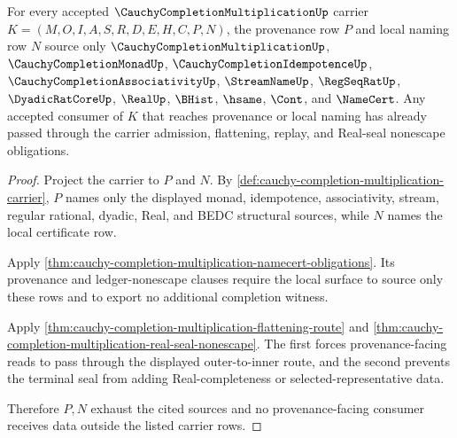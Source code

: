\begin{theorem}
\label{thm:cauchy-completion-multiplication-provenance-exhaustion}
For every accepted $\CauchyCompletionMultiplicationUp$ carrier $K=(M,O,I,A,S,R,D,E,H,C,P,N)$, the provenance row $P$ and local naming row $N$ source only $\CauchyCompletionMultiplicationUp$, $\CauchyCompletionMonadUp$, $\CauchyCompletionIdempotenceUp$, $\CauchyCompletionAssociativityUp$, $\StreamNameUp$, $\RegSeqRatUp$, $\DyadicRatCoreUp$, $\RealUp$, $\BHist$, $\hsame$, $\Cont$, and $\NameCert$. Any accepted consumer of $K$ that reaches provenance or local naming has already passed through the carrier admission, flattening, replay, and Real-seal nonescape obligations.
\end{theorem}
\begin{proof}
Project the carrier to $P$ and $N$. By \autoref{def:cauchy-completion-multiplication-carrier}, $P$ names only the displayed monad, idempotence, associativity, stream, regular rational, dyadic, Real, and BEDC structural sources, while $N$ names the local certificate row.

Apply \autoref{thm:cauchy-completion-multiplication-namecert-obligations}. Its provenance and ledger-nonescape clauses require the local surface to source only these rows and to export no additional completion witness.

Apply \autoref{thm:cauchy-completion-multiplication-flattening-route} and \autoref{thm:cauchy-completion-multiplication-real-seal-nonescape}. The first forces provenance-facing reads to pass through the displayed outer-to-inner route, and the second prevents the terminal seal from adding Real-completeness or selected-representative data.

Therefore $P,N$ exhaust the cited sources and no provenance-facing consumer receives data outside the listed carrier rows.
\end{proof}


